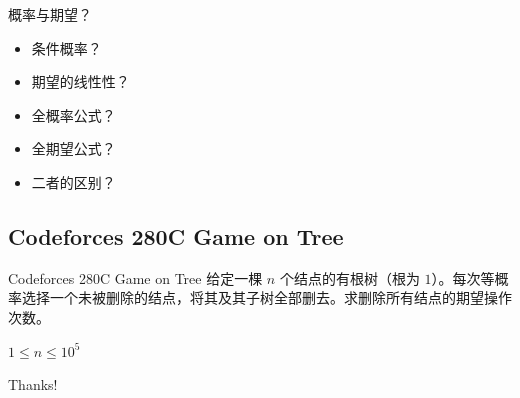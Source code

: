 ﻿\documentclass[aspectratio=169]{ctexbeamer}
\begin{document}
\begin{frame}
    概率与期望？
    \begin{itemize}
        \item 条件概率？
        \item 期望的线性性？
        \item 全概率公式？
        \item 全期望公式？
        \item 二者的区别？
    \end{itemize}
\end{frame}

\subsection{Codeforces 280C Game on Tree}

\begin{frame}{Codeforces 280C Game on Tree}
      给定一棵 $n$ 个结点的有根树（根为 $1$）。每次等概率选择一个未被删除的结点，将其及其子树全部删去。求删除所有结点的期望操作次数。
      
      $1\le n\le 10^5$
\end{frame}

\begin{frame}
    \begin{center}
        {\Huge\calligra Thanks!}
    \end{center}
\end{frame}
\end{document}

